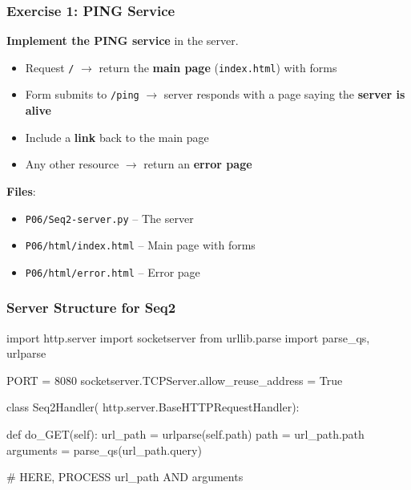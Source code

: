 \documentclass[xcolor=table]{beamer}
\begin{document}
\begin{frame}[fragile]
\frametitle{Exercise 1: PING Service}

\textbf{Implement the PING service} in the server.

\vspace{0.2cm}

\begin{itemize}
\item Request \texttt{/} $\rightarrow$ return the \textbf{main page} (\texttt{index.html}) with forms
\item Form submits to \texttt{/ping} $\rightarrow$ server responds with a page saying the \textbf{server is alive}
\item Include a \textbf{link} back to the main page
\item Any other resource $\rightarrow$ return an \textbf{error page}
\end{itemize}

\vspace{0.3cm}

\textbf{Files}:
\begin{itemize}
\item \texttt{P06/Seq2-server.py} -- The server
\item \texttt{P06/html/index.html} -- Main page with forms
\item \texttt{P06/html/error.html} -- Error page
\end{itemize}

\end{frame}

\begin{frame}[fragile]
\frametitle{Server Structure for Seq2}

\begin{python}
import http.server
import socketserver
from urllib.parse import parse_qs, urlparse

PORT = 8080
socketserver.TCPServer.allow_reuse_address = True

class Seq2Handler(
        http.server.BaseHTTPRequestHandler):

    def do_GET(self):
        url_path = urlparse(self.path)
        path = url_path.path
        arguments = parse_qs(url_path.query)

        # HERE, PROCESS url_path AND arguments
\end{python}

\end{frame}

\end{document}
